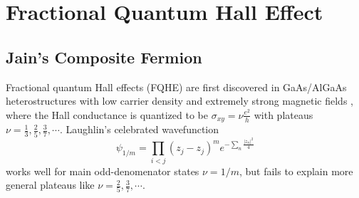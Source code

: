 
\section{Fractional Quantum Hall Effect}
\subsection{Jain's Composite Fermion}
Fractional quantum Hall effects (FQHE) are first discovered in GaAs/AlGaAs heterostructures with low carrier density and extremely strong magnetic fields \cite{tsui1982two,stormer1999fractional}, where the Hall conductance is quantized to be $\sigma_{xy}=\nu\frac{e^2}{h}$ with plateaus $\nu=\frac{1}{3},\frac{2}{5},\frac{3}{7},\cdots$. Laughlin's celebrated wavefunction \cite{laughlin1983anomalous}
\begin{equation*}
    \psi_{1/m}=\prod_{i<j}(z_j-z_j)^m e^{-\sum_n\frac{|z_n|^2}{4}}
\end{equation*}
works well for main odd-denomenator states $\nu=1/m$, but fails to explain more general plateaus like $\nu=\frac{2}{5},\frac{3}{7},\cdots$.

